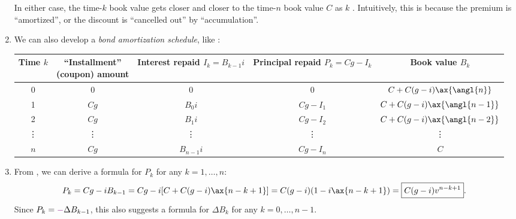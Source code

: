 \begin{enumerate}
\begin{itemize}
\end{itemize}
In either case, the time-\(k\) book value gets closer and closer to the
time-\(n\) book value \(C\) as \(k\) . Intuitively, this is
because the premium is ``amortized'', or the discount is ``cancelled out'' by
``accumulation''.

\item \label{it:bond-amort-schedule}
We can also develop a \emph{bond amortization schedule}, like
:
\begin{center}
\begin{tabular}{ccccc}
\toprule
Time \(k\)&
\makecell{``Installment''\\ (coupon) amount}&
\makecell{Interest repaid\\ \(I_k=B_{k-1}i\)}&
\makecell{Principal repaid \\ \(P_k=Cg-I_k\)}&Book value \(B_k\) \\
\midrule
0&\(0\)&\(0\)&\(0\)&\(C+C(g-i)\ax{\angl{n}}\) \\
1&\(Cg\)&\(B_0i\)&\(Cg-I_1\)&\(C+C(g-i)\ax{\angl{n-1}}\) \\
2&\(Cg\)&\(B_1i\)&\(Cg-I_2\)&\(C+C(g-i)\ax{\angl{n-2}}\) \\
\vdots&\vdots&\vdots&\vdots&\vdots\\
\(n\)&\(Cg\)&\(B_{n-1}i\)&\(Cg-I_{n}\)&\(C\)\\
\bottomrule
\end{tabular}
\end{center}

\item \label{it:bond-amort-pk-fmla}
From , we can derive a formula for
\(P_k\) for any \(k=1,\dotsc,n\):
\[
P_k=Cg-iB_{k-1}
=Cg-i\qty[C+C(g-i)\ax{n-k+1}]
=C(g-i)(1-i\ax{n-k+1})
=\boxed{C(g-i)v^{n-k+1}}.
\]
Since \(P_k={\color{violet}-}\Delta B_{k-1}\), this also suggests a formula for
\(\Delta B_k\) for any \(k=0,\dotsc,n-1\).
\end{enumerate}

